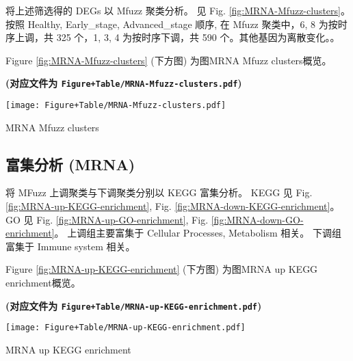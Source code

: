 \documentclass[
]{article}
\begin{document}
将上述筛选得的 DEGs 以 Mfuzz 聚类分析。
见 Fig. \ref{fig:MRNA-Mfuzz-clusters}。按照 Healthy, Early\_stage, Advanced\_stage 顺序, 在 Mfuzz 聚类中，6, 8 为按时序上调，共 325 个，1, 3, 4 为按时序下调，共 590 个。其他基因为离散变化。。

\begin{center}\vspace{1.5cm}\end{center}

Figure \ref{fig:MRNA-Mfuzz-clusters} (下方图) 为图MRNA Mfuzz clusters概览。

\textbf{(对应文件为 \texttt{Figure+Table/MRNA-Mfuzz-clusters.pdf})}

\def\@captype{figure}
\begin{center}
\texttt{[image: Figure+Table/MRNA-Mfuzz-clusters.pdf]}
\caption{MRNA Mfuzz clusters}\label{fig:MRNA-Mfuzz-clusters}
\end{center}

\begin{center}\vspace{1.5cm}\end{center}

\hypertarget{ux5bccux96c6ux5206ux6790-mrna}{%
\subsection{富集分析 (MRNA)}\label{ux5bccux96c6ux5206ux6790-mrna}}

将 MFuzz 上调聚类与下调聚类分别以 KEGG 富集分析。
KEGG 见 Fig. \ref{fig:MRNA-up-KEGG-enrichment}, Fig. \ref{fig:MRNA-down-KEGG-enrichment}。
GO 见 Fig. \ref{fig:MRNA-up-GO-enrichment}, Fig. \ref{fig:MRNA-down-GO-enrichment}。
上调组主要富集于 Cellular Processes, Metabolism 相关。
下调组富集于 Immune system 相关。

\begin{center}\vspace{1.5cm}\end{center}

Figure \ref{fig:MRNA-up-KEGG-enrichment} (下方图) 为图MRNA up KEGG enrichment概览。

\textbf{(对应文件为 \texttt{Figure+Table/MRNA-up-KEGG-enrichment.pdf})}

\def\@captype{figure}
\begin{center}
\texttt{[image: Figure+Table/MRNA-up-KEGG-enrichment.pdf]}
\caption{MRNA up KEGG enrichment}\label{fig:MRNA-up-KEGG-enrichment}
\end{center}
\end{document}
